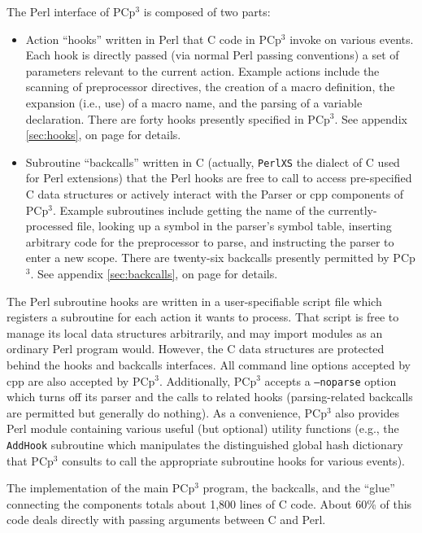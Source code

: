 \documentclass{article}
\newcommand{\pcp}{\mbox{\textsf{PCp}$^3$}}
\newcommand{\Cpp}{\mbox{\textsf{cpp}}}
\newcommand{\Perl}{\mbox{\textsf{Perl}}}
\newcommand{\C}{\mbox{\textsf{C}}}
\newcommand{\appendixref}[1]{appendix \ref{#1}, on page \pageref{#1}}
\newcommand{\ie}{i.e.,}
\newcommand{\eg}{e.g.,}
\begin{document}
The \Perl{} interface of \pcp{} is composed of two parts:

\begin{itemize}
\item Action ``hooks'' written in \Perl{} that \C{} code in \pcp{}
      invoke on various events. Each hook is directly passed (via
      normal \Perl{} passing conventions) a set of parameters relevant
      to the current action.  Example actions include the scanning of
      preprocessor directives, the creation of a macro definition, the
      expansion (\ie{} use) of a macro name, and the parsing of a
      variable declaration.  There are forty hooks presently
      specified in \pcp{}. See \appendixref{sec:hooks} for details.
\item Subroutine ``backcalls'' written in \C{} (actually,
      \texttt{PerlXS} the dialect of \C{} used for \Perl{} extensions)
      that the \Perl{} hooks are free to call to access pre-specified
      \C{} data structures or actively interact with the Parser or
      \Cpp{} components of \pcp{}.  Example subroutines include getting
      the name of the currently-processed file, looking up a symbol in
      the parser's symbol table, inserting arbitrary code for the
      preprocessor to parse, and instructing the parser to enter a new
      scope.  There are twenty-six backcalls presently permitted by
      \pcp{}.  See \appendixref{sec:backcalls} for details.
\end{itemize}

\noindent The \Perl{} subroutine hooks are written in a user-specifiable script
file which registers a subroutine for each action it wants to process.
That script is free to manage its local data structures arbitrarily, and
may import modules as an ordinary \Perl{} program would.  However, the
\C{} data structures are protected behind the hooks and backcalls
interfaces. All command line options accepted by \Cpp{} are also
accepted by \pcp{}.  Additionally, \pcp{} accepts a \texttt{--noparse}
option which turns off its parser and the calls to related hooks
(parsing-related backcalls are permitted but generally do nothing).  As
a convenience, \pcp{} also provides \Perl{} module containing various
useful (but optional) utility functions (\eg{} the \texttt{AddHook}
subroutine which manipulates the distinguished global hash dictionary
that \pcp{} consults to call the appropriate subroutine hooks for
various events).

The implementation of the main \pcp{} program, the backcalls, and the
``glue'' connecting the components totals about 1,800 lines of \C{}
code.  About 60\% of this code deals directly with passing arguments
between \C{} and \Perl{}.
\end{document}
